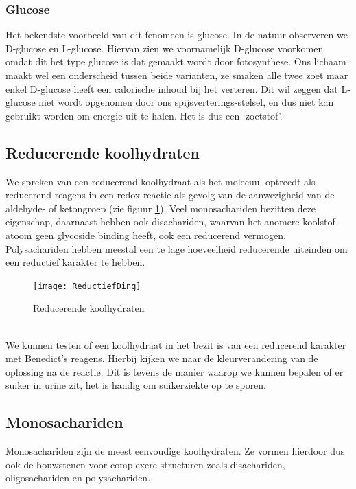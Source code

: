 \documentclass[a4paper,kul]{kulakarticle} %
\begin{document}
\subsubsection{Glucose}
Het bekendste voorbeeld van dit fenomeen is glucose. In de natuur observeren we D-glucose en L-glucose. Hiervan zien we voornamelijk D-glucose voorkomen omdat dit het type glucose is dat gemaakt wordt door fotosynthese. Ons lichaam maakt wel een onderscheid tussen beide varianten, ze smaken alle twee zoet maar enkel D-glucose heeft een calorische inhoud bij het verteren. Dit wil zeggen dat L-glucose niet wordt opgenomen door ons spijsverterings-stelsel, en dus niet kan  gebruikt worden om energie uit te halen. Het is dus een `zoetstof'.

\subsection{Reducerende koolhydraten}
We spreken van een reducerend koolhydraat als het molecuul optreedt als reducerend reagens in een redox-reactie als gevolg van de aanwezigheid van de aldehyde- of ketongroep (zie figuur \ref{fig:reductiefding}). Veel monosachariden bezitten deze eigenschap, daarnaast hebben ook disachariden, waarvan het anomere koolstof-atoom geen glycoside binding heeft, ook een reducerend vermogen. Polysachariden hebben meestal een te lage hoeveelheid reducerende uiteinden om een reductief karakter te hebben.
\begin{figure}[htbp]
	\centering
	\texttt{[image: ReductiefDing]}
	\caption[Reducerende koolhydraten]{Reducerende koolhydraten}
	\label{fig:reductiefding}
\end{figure}\\
We kunnen testen of een koolhydraat in het bezit is van een reducerend karakter met Benedict's reagens. Hierbij kijken we naar de kleurverandering van de oplossing na de reactie. Dit is tevens de manier waarop we kunnen bepalen of er suiker in urine zit, het is handig om suikerziekte op te sporen.

\subsection{Monosachariden}
Monosachariden zijn de meest eenvoudige koolhydraten. Ze vormen hierdoor dus ook de bouwstenen voor complexere structuren zoals disachariden, oligosachariden en polysachariden. 
\end{document}
